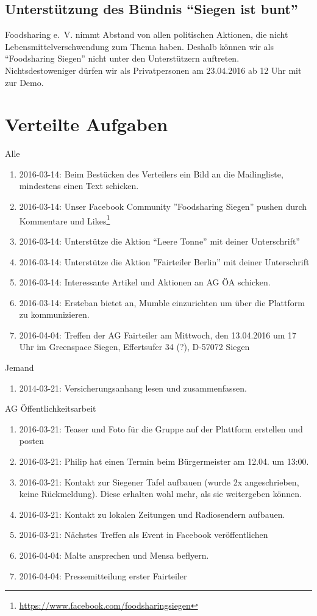 \documentclass{scrreprt}
\begin{document}
\section{Unterstützung des Bündnis \enquote{Siegen ist bunt}}
Foodsharing e.~V. nimmt Abstand von allen politischen Aktionen, die nicht Lebensmittelverschwendung zum Thema haben. Deshalb können wir als \enquote{Foodsharing Siegen} nicht unter den Unterstützern auftreten. Nichtsdestoweniger dürfen wir als Privatpersonen am 23.04.2016 ab 12 Uhr mit zur Demo.
\chapter{Verteilte Aufgaben}
Alle
\begin{enumerate}
\item 2016-03-14: Beim Bestücken des Verteilers ein Bild an die Mailingliste, mindestens einen Text schicken.
\item 2016-03-14: Unser Facebook Community ”Foodsharing Siegen” pushen durch Kommentare und Likes\footnote{\url{https://www.facebook.com/foodsharingsiegen}}
\item 2016-03-14: Unterstütze die Aktion \enquote{Leere Tonne” mit deiner Unterschrift}
\item 2016-03-14: Unterstütze die Aktion ”Fairteiler Berlin” mit deiner Unterschrift
\item 2016-03-14: Interessante Artikel und Aktionen an AG ÖA schicken.
\item 2016-03-14: Ersteban bietet an, Mumble einzurichten um über die Plattform zu kommunizieren.
\item 2016-04-04: Treffen der AG Fairteiler am Mittwoch, den 13.04.2016 um 17 Uhr im Greenspace Siegen, Effertsufer 34 (?), D-57072 Siegen
\end{enumerate}
Jemand
\begin{enumerate}
\item 2014-03-21: Versicherungsanhang lesen und zusammenfassen.
\end{enumerate}
AG Öffentlichkeitsarbeit
\begin{enumerate}
    \item 2016-03-21: Teaser und Foto für die Gruppe auf der Plattform erstellen und posten
    \item 2016-03-21: Philip hat einen Termin beim Bürgermeister am 12.04. um 13:00.
    \item 2016-03-21: Kontakt zur Siegener Tafel aufbauen (wurde 2x angeschrieben, keine Rückmeldung). Diese erhalten wohl mehr, als sie weitergeben können.
    \item 2016-03-21: Kontakt zu lokalen Zeitungen und Radiosendern aufbauen.
    \item 2016-03-21: Nächstes Treffen als Event in Facebook veröffentlichen
    \item 2016-04-04: Malte ansprechen und Mensa beflyern.
    \item 2016-04-04: Pressemitteilung erster Fairteiler
\end{enumerate}
\end{document}
